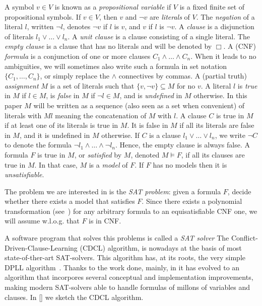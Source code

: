 \documentclass{llncs}
\begin{document}
A symbol $v \in V $ is known as a \emph{propositional variable} if $V$
is a fixed finite set of propositional symbols.  If $v \in V$, then
$v$ and $\lnot v$ are \emph{literals} of $V$.  The \emph{negation} of
a literal $l$, written $\lnot l$, denotes $\lnot v$ if $l$ is $v$, and
$v$ if $l$ is $\lnot v$.  A \emph{clause} is a disjunction of literals
$l_1 \lor\ldots\lor l_n$.  A \emph{unit clause} is a clause consisting
of a single literal.  The \emph{empty clause} is a clause that has no
literals and will be denoted by $\Box$.  A (CNF) \emph{formula} is a
conjunction of one or more clauses $C_1 \land\ldots\land C_n$. When it
leads to no ambiguities, we will sometimes also write such a formula
in set notation $\{C_1,\ldots,C_n\}$, or simply replace the $\land$
connectives by commas.  A (partial truth) \emph{assignment} $M$ is a
set of literals such that $\{ v, \lnot v \} \subseteq M$ for no $v$. A
literal $l$ is \emph{true} in $M$ if $l \in M$, is \emph{false} in $M$
if $\lnot l \in M$, and is \emph{undefined} in $M$ otherwise.  In this
paper $M$ will be written as a sequence (also seen as a set when
convenient) of literals with $M l$ meaning the concatenation of $M$
with $l$.  A clause $C$ is true in $M$ if at least one of its literals
is true in $M$.  It is false in $M$ if all its literals are false in
$M$, and it is undefined in $M$ otherwise.  If $C$ is a clause $l_1
\lor\ldots\lor l_n$, we write $\lnot C$ to denote the formula $\lnot
l_1 \land\ldots\land \lnot l_n$.  Hence, the empty clause is always
false.  A formula $F$ is true in $M$, or \emph{satisfied} by $M$,
denoted $M\models F$, if all its clauses are true in $M$.  In that
case, $M$ is a \emph{model} of $F$.  If $F$ has no models then it is
\emph{unsatisfiable}.

The problem we are interested in is the \emph{SAT problem}: given a
formula $F$, decide whether there exists a model that satisfies $F$.
Since there exists a polynomial transformation
(see~\cite{Tseitin1968}) for any arbitrary formula to an
equisatisfiable CNF one, we will assume w.l.o.g. that $F$ is in CNF.

A software program that solves this problems is called a \emph{SAT
  solver} The Conflict-Driven-Clause-Learning (CDCL) algorithm, is
nowadays at the basis of most state-of-ther-art
SAT-solvers\cite{EenSorensson2003SAT,picosat2008,rsat,siege,plingeling}. This
algorithm has, at its roots, the very simple DPLL
algorithm~\cite{Davisetal1962CACM}. Thanks to the work done, mainly,
in \cite{relsat,Chaff2001,GRASP1999IEEE,ZhangStickel1996IMATH} it has
evolved to an algorithm that incorpores several conceptual and
implementation improvements, making modern SAT-solvers able to handle
formulas of millons of variables and clauses. In \ref{} we sketch the
CDCL algorithm.
\end{document}
